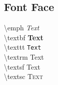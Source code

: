 \documentclass[a4paper,12pt,titlepage]{article}
\begin{document}
\subsection{Font Face}
\hspace*{4mm}\textbackslash emph			\hspace*{8mm}\emph{Text}
\\\hspace*{4mm}\textbackslash textbf 		\hspace*{8mm}\textbf{Text}
\\\hspace*{4mm}\textbackslash texttt 		\hspace*{9mm}\texttt{Text}
\\\hspace*{4mm}\textbackslash textrm 		\hspace*{7mm}\textrm{Text}
\\\hspace*{4mm}\textbackslash textsf 		\hspace*{9mm}\textsf{Text}
\\\hspace*{4mm}\textbackslash textsc 		\hspace*{8mm}\textsc{Text}
\\
\end{document}
